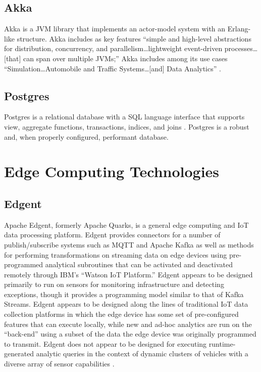 \documentclass{thesis}
\begin{document}
    \subsection{Akka}
        Akka is a JVM library that implements an actor-model system with an Erlang-like structure.
        Akka includes as key features ``simple and high-level abstractions for distribution,
        concurrency, and parallelism\dots lightweight event-driven processes\dots[that] can span
        over multiple JVMs;'' Akka includes among its use cases ``Simulation\dots Automobile and
        Traffic Systems\dots [and] Data Analytics'' \cite{akka}. %
    \subsection{Postgres}
        Postgres is a relational database with a SQL language interface that supports view, aggregate
        functions, transactions, indices, and joins \cite{postgres}. Postgres is a robust and, when
        properly configured, performant database.
    \section{Edge Computing Technologies}
    \subsection{Edgent}
        Apache Edgent, formerly Apache Quarks, is a general edge computing and IoT data processing
        platform. Edgent provides connectors for a number of publish/subscribe systems such as 
        MQTT and Apache Kafka as well as methods for performing transformations on streaming
        data on edge devices using pre-programmed analytical subroutines that can be activated and
        deactivated remotely through IBM's ``Watson IoT Platform.'' Edgent appears to be designed
        primarily to run on sensors for monitoring infrastructure and detecting exceptions, though
        it provides a programming model similar to that of Kafka Streams. Edgent appears to be 
        designed along the lines of traditional IoT data collection platforms in which the edge
        device has some set of pre-configured features that can execute locally, while new and
        ad-hoc analytics are run on the ``back-end'' using a subset of the data the edge device
        was originally programmed to transmit. Edgent does not appear to be designed for executing
        runtime-generated analytic queries in the context of dynamic clusters of vehicles with a diverse
        array of sensor capabilities \cite{edgent}.
\end{document}

